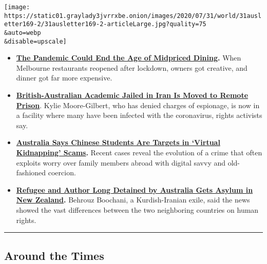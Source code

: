 \texttt{[image: https://static01.graylady3jvrrxbe.onion/images/2020/07/31/world/31ausletter169-2/31ausletter169-2-articleLarge.jpg?quality=75\\\&auto=webp\\\&disable=upscale]}

\begin{itemize}
\tightlist
\item
  \textbf{\href{https://www.nytimes3xbfgragh.onion/2020/07/28/dining/melbourne-restaurants-coronavirus.html}{The
  Pandemic Could End the Age of Midpriced Dining}.} When Melbourne
  restaurants reopened after lockdown, owners got creative, and dinner
  got far more expensive.
\end{itemize}

\begin{itemize}
\tightlist
\item
  \textbf{\href{https://www.nytimes3xbfgragh.onion/2020/07/28/world/europe/british-australian-academic-jail-iran-qarchak.html}{British-Australian
  Academic Jailed in Iran Is Moved to Remote Prison}}. Kylie
  Moore-Gilbert, who has denied charges of espionage, is now in a
  facility where many have been infected with the coronavirus, rights
  activists say.
\end{itemize}

\begin{itemize}
\item
  \textbf{\href{https://www.nytimes3xbfgragh.onion/2020/07/28/world/australia/chinese-students-virtual-kidnapping.html}{Australia
  Says Chinese Students Are Targets in `Virtual Kidnapping' Scams}.}
  Recent cases reveal the evolution of a crime that often exploits worry
  over family members abroad with digital savvy and old-fashioned
  coercion.
\item
  \textbf{\href{https://www.nytimes3xbfgragh.onion/2020/07/24/world/australia/behrouz-boochani-asylum-new-zealand.html}{Refugee
  and Author Long Detained by Australia Gets Asylum in New Zealand}.}
  Behrouz Boochani, a Kurdish-Iranian exile, said the news showed the
  vast differences between the two neighboring countries on human
  rights.
\end{itemize}

\begin{center}\rule{0.5\linewidth}{\linethickness}\end{center}

\hypertarget{around-the-times}{%
\subsection{Around the Times}\label{around-the-times}}

